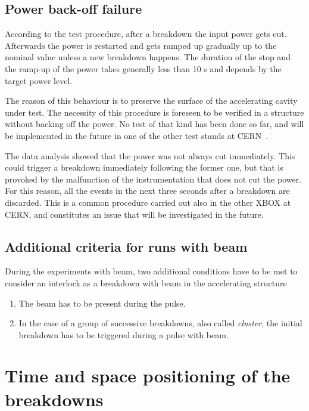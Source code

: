 \subsection{Power back-off failure}
\label{sec:pbof}

According to the test procedure, after a breakdown the input power gets cut. Afterwards the power is restarted and gets ramped up gradually up to the nominal value unless a new breakdown happens. The duration of the stop and the ramp-up of the power takes generally less than 10 s and depends by the target power level.

The reason of this behaviour is to preserve the surface of the accelerating cavity under test. The necessity of this procedure is foreseen to be verified in a structure without backing off the power. No test of that kind has been done so far, and will be implemented in the future in one of the other test stands at CERN~\cite{Walter:PC}.

The data analysis showed that the power was not always cut immediately. This could trigger a breakdown  immediately following the former one, but that is provoked by the malfunction of the instrumentation that does not cut the power. For this reason, all the events in the next three seconds after a breakdown are discarded. This is a common procedure carried out also in the other XBOX at CERN, and constitutes an issue that will be investigated in the future. 


\subsection[Additional criteria for runs with beam]{Additional criteria for runs with beam}

During the experiments with beam, two additional conditions have to be met to consider an interlock as a breakdown with beam in the accelerating structure
\begin{enumerate}
\item The beam has to be present during the pulse.
\item In the case of a group of successive breakdowns, also called \textit{cluster}, the initial breakdown has to be triggered during a pulse with beam.
\end{enumerate}





\section[Time and space positioning of the breakdowns]{Time and space positioning of the breakdowns}

